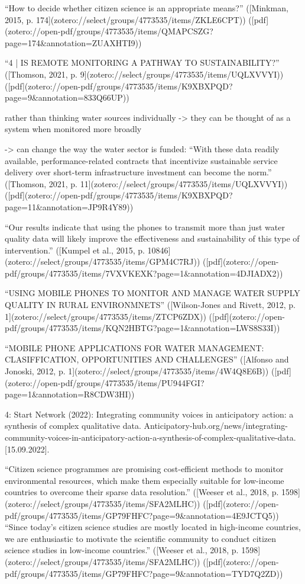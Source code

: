 {“How to decide whether citizen science is an appropriate means?” ([Minkman, 2015, p. 174](zotero://select/groups/4773535/items/ZKLE6CPT)) ([pdf](zotero://open-pdf/groups/4773535/items/QMAPCSZG?page=174&annotation=ZUAXHTI9))

“4 | IS REMOTE MONITORING A PATHWAY TO SUSTAINABILITY?” ([Thomson, 2021, p. 9](zotero://select/groups/4773535/items/UQLXVVYI)) ([pdf](zotero://open-pdf/groups/4773535/items/K9XBXPQD?page=9&annotation=833Q66UP))

rather than thinking water sources individually -> they can be thought of as a system when monitored more broadly

-> can change the way the water sector is funded: “With these data readily available, performance-related contracts that incentivize sustainable service delivery over short-term infrastructure investment can become the norm.” ([Thomson, 2021, p. 11](zotero://select/groups/4773535/items/UQLXVVYI)) ([pdf](zotero://open-pdf/groups/4773535/items/K9XBXPQD?page=11&annotation=JP9R4Y89))

“Our results indicate that using the phones to transmit more than just water quality data will likely improve the effectiveness and sustainability of this type of intervention.” ([Kumpel et al., 2015, p. 10846](zotero://select/groups/4773535/items/GPM4C7RJ)) ([pdf](zotero://open-pdf/groups/4773535/items/7VXVKEXK?page=1&annotation=4DJIADX2))

“USING MOBILE PHONES TO MONITOR AND MANAGE WATER SUPPLY QUALITY IN RURAL ENVIRONMNETS” ([Wilson-Jones and Rivett, 2012, p. 1](zotero://select/groups/4773535/items/ZTCP6ZDX)) ([pdf](zotero://open-pdf/groups/4773535/items/KQN2HBTG?page=1&annotation=LWS8S33I))

“MOBILE PHONE APPLICATIONS FOR WATER MANAGEMENT: CLASIFFICATION, OPPORTUNITIES AND CHALLENGES” ([Alfonso and Jonoski, 2012, p. 1](zotero://select/groups/4773535/items/4W4Q8E6B)) ([pdf](zotero://open-pdf/groups/4773535/items/PU944FGI?page=1&annotation=R8CDW3HI))

4: Start Network (2022): Integrating community voices in anticipatory action: a synthesis of complex qualitative data. Anticipatory-hub.org/news/integrating-community-voices-in-anticipatory-action-a-synthesis-of-complex-qualitative-data. [15.09.2022].

“Citizen science programmes are promising cost-efficient methods to monitor environmental resources, which make them especially suitable for low-income countries to overcome their sparse data resolution.” ([Weeser et al., 2018, p. 1598](zotero://select/groups/4773535/items/SFA2MLHC)) ([pdf](zotero://open-pdf/groups/4773535/items/GP79FHFC?page=9&annotation=4E9JCTQ5))
“Since today's citizen science studies are mostly located in high-income countries, we are enthusiastic to motivate the scientific community to conduct citizen science studies in low-income countries.” ([Weeser et al., 2018, p. 1598](zotero://select/groups/4773535/items/SFA2MLHC)) ([pdf](zotero://open-pdf/groups/4773535/items/GP79FHFC?page=9&annotation=TYD7Q2ZD))

}
